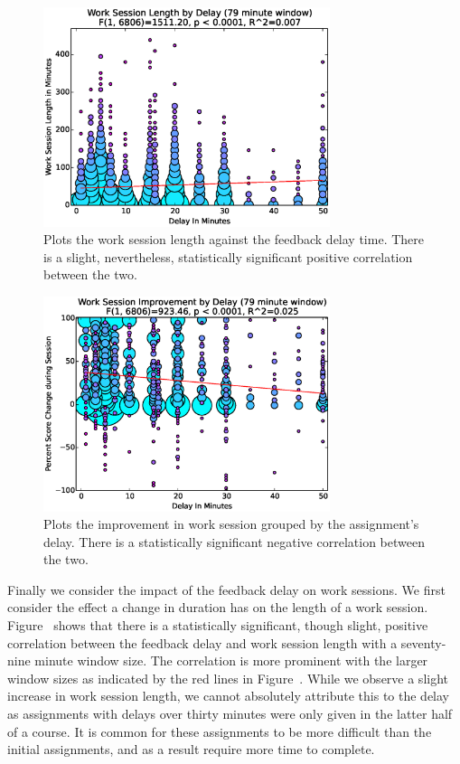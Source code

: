 \begin{figure}[!t]
\centering \includegraphics[width=3.3in]{graphs/Work_Session_Length_by_Delay_(79_minute_window).eps}
\caption{Plots the work session length against the feedback delay time. There
  is a slight, nevertheless, statistically significant positive correlation
  between the two.}
\end{figure}

\begin{figure}[!t]
\centering \includegraphics[width=3.3in]{graphs/Work_Session_Improvement_by_Delay_(79_minute_window).eps}
\caption{Plots the improvement in work session grouped by the assignment's
  delay. There is a statistically significant negative correlation between the
  two.}
\end{figure}

Finally we consider the impact of the feedback delay on work sessions. We first
consider the effect a change in duration has on the length of a work
session. Figure~ shows that there is a
statistically significant, though slight, positive correlation between the
feedback delay and work session length with a seventy-nine minute window
size. The correlation is more prominent with the larger window sizes as
indicated by the red lines in Figure~. While we
observe a slight increase in work session length, we cannot absolutely
attribute this to the delay as assignments with delays over thirty minutes were
only given in the latter half of a course. It is common for these assignments
to be more difficult than the initial assignments, and as a result require more
time to complete.

